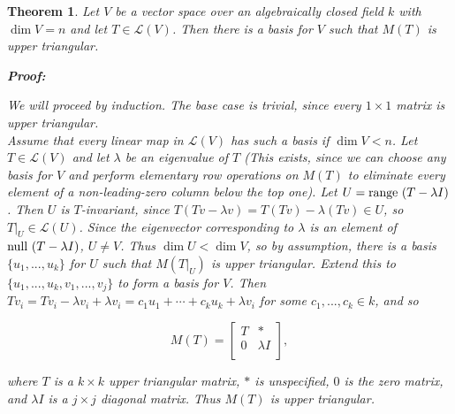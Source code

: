 \documentclass{article}
\theoremstyle{colontheorem}
\newtheorem{theorem}{Theorem}[section]
\newcommand{\Null}{\textnormal{null }}
\newcommand{\Range}{\textnormal{range }}
\newenvironment{Theorem}
{
	\begin{mdframed}[backgroundcolor=TheoremOrange!10]
	\begin{theorem}
}
{
	\end{theorem}
	\end{mdframed}
	
	\vspace{.15in}
}
\newenvironment{Proof}
{
	\begin{mdframed}[backgroundcolor=ProofPurple!10]
	\textbf{Proof:}%
}
{
	\end{mdframed}
	
	\vspace{.085in}
}
\begin{document}
\begin{Theorem}
	
	Let $V$ be a vector space over an algebraically closed field $k$ with $\dim V = n$ and let $T \in \mathcal{L}(V)$. Then there is a basis for $V$ such that $M(T)$ is upper triangular.
	
	\begin{Proof}
		We will proceed by induction. The base case is trivial, since every $1 \times 1$ matrix is upper triangular.\\
		
		Assume that every linear map in $\mathcal{L}(V)$ has such a basis if $\dim V < n$. Let $T \in \mathcal{L}(V)$ and let $\lambda$ be an eigenvalue of $T$ (This exists, since we can choose any basis for $V$ and perform elementary row operations on $M(T)$ to eliminate every element of a non-leading-zero column below the top one). Let $U = \Range (T - \lambda I)$. Then $U$ is $T$-invariant, since $T(Tv - \lambda v) = T(Tv) - \lambda (Tv) \in U$, so $T|_U \in \mathcal{L}(U)$. Since the eigenvector corresponding to $\lambda$ is an element of $\Null (T - \lambda I)$, $U \neq V$. Thus $\dim U < \dim V$, so by assumption, there is a basis $\{u_1, ..., u_k\}$ for $U$ such that $M(T|_U)$ is upper triangular. Extend this to $\{u_1, ..., u_k, v_1, ..., v_j\}$ to form a basis for $V$. Then $Tv_i = Tv_i - \lambda v_i + \lambda v_i = c_1 u_1 + \cdots + c_k u_k + \lambda v_i$ for some $c_1, ..., c_k \in k$, and so
		
		$$
		M(T) = \begin{bmatrix}
			T & *\\
			0 & \lambda I\\
		\end{bmatrix},
		$$
		
		where $T$ is a $k \times k$ upper triangular matrix, $*$ is unspecified, $0$ is the zero matrix, and $\lambda I$ is a $j \times j$ diagonal matrix. Thus $M(T)$ is upper triangular.
		
	\end{Proof}
	
\end{Theorem}
\end{document}
